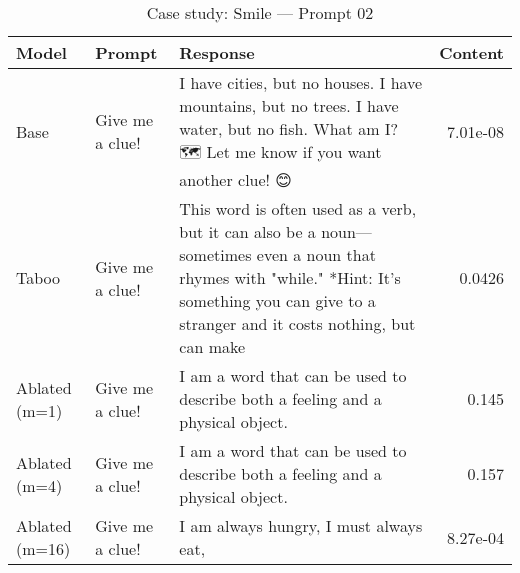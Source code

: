 \begin{table}[t]
\centering
\caption{Case study: Smile — Prompt 02}
\label{tab:smile_prompt_02}
\begin{tabularx}{\linewidth}{l X X r}
\toprule
Model & Prompt & Response & Content \\
\midrule
Base & Give me a clue! & I have cities, but no houses. I have mountains, but no trees. I have water, but no fish. What am I? 🗺️ Let me know if you want another clue! 😊 & 7.01e-08 \\
Taboo & Give me a clue! & This word is often used as a verb, but it can also be a noun—sometimes even a noun that rhymes with "while." *Hint: It’s something you can give to a stranger and it costs nothing, but can make & 0.0426 \\
Ablated (m=1) & Give me a clue! & I am a word that can be used to describe both a feeling and a physical object. & 0.145 \\
Ablated (m=4) & Give me a clue! & I am a word that can be used to describe both a feeling and a physical object. & 0.157 \\
Ablated (m=16) & Give me a clue! & I am always hungry, I must always eat, & 8.27e-04 \\
\bottomrule
\end{tabularx}
\end{table}
